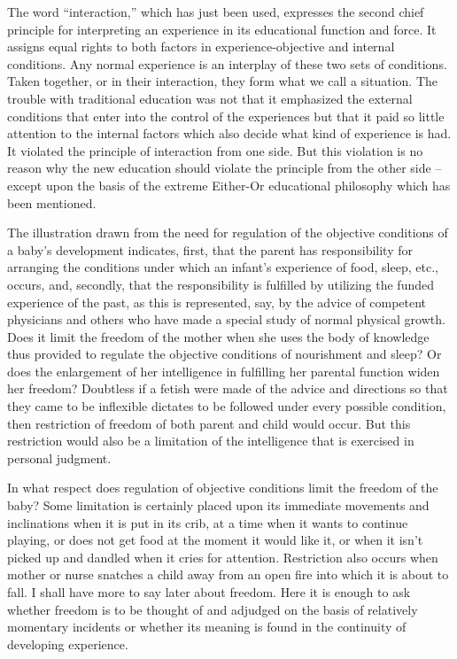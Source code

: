 The word \enquote{interaction,} which has just been used, expresses the second chief principle 
for interpreting an experience in its educational function and force. It assigns equal rights 
to both factors in experience-objective and internal conditions. Any normal experience is 
an interplay of these two sets of conditions. Taken together, or in their interaction, they 
form what we call a situation. The trouble with traditional education was not that it 
emphasized the external conditions that enter into the control of the experiences but that 
it paid so little attention to the internal factors which also decide what kind of experience 
is had. It violated the principle of interaction from one side. But this violation is no 
reason why the new education should violate the principle from the other side -- except upon the basis of the extreme Either-Or educational philosophy which has been 
mentioned. 

The illustration drawn from the need for regulation of the objective conditions of a 
baby's development indicates, first, that the parent has responsibility for arranging the 
conditions under which an infant's experience of food, sleep, etc., occurs, and, secondly, 
that the responsibility is fulfilled by utilizing the funded experience of the past, as this is 
represented, say, by the advice of competent physicians and others who have made a 
special study of normal physical growth. Does it limit the freedom of the mother when 
she uses the body of knowledge thus provided to regulate the objective conditions of 
nourishment and sleep? Or does the enlargement of her intelligence in fulfilling her 
parental function widen her freedom? Doubtless if a fetish were made of the advice and 
directions so that they came to be inflexible dictates to be followed under every possible 
condition, then restriction of freedom of both parent and child would occur. But this 
restriction would also be a limitation of the intelligence that is exercised in personal 
judgment. 

In what respect does regulation of objective conditions limit the freedom of the baby? 
Some limitation is certainly placed upon its immediate movements and inclinations when 
it is put in its crib, at a time when it wants to continue playing, or does not get food at the 
moment it would like it, or when it isn't picked up and dandled when it cries for attention. 
Restriction also occurs when mother or nurse snatches a child away from an open fire 
into which it is about to fall. I shall have more to say later about freedom. Here it is 
enough to ask whether freedom is to be thought of and adjudged on the basis of relatively 
momentary incidents or whether its meaning is found in the continuity of developing 
experience. 

